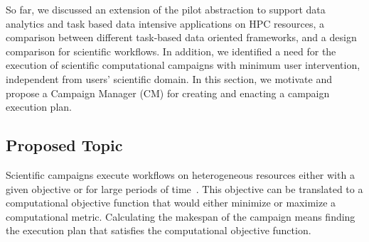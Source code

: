 \label{research}
So far, we discussed an extension of the pilot abstraction to support data analytics and task based data intensive applications on HPC resources, a comparison between different task-based data oriented frameworks, and a design comparison for scientific workflows.
In addition, we identified a need for the execution of scientific computational campaigns with minimum user intervention, independent from users' scientific domain.
In this section, we motivate and propose a Campaign Manager (CM) for creating and enacting a campaign execution plan. 


\subsection{Proposed Topic}

Scientific campaigns execute workflows on heterogeneous resources either with a given objective or for large periods of time~\cite{maeno2008panda}.
This objective can be translated to a computational objective function that would either minimize or maximize a computational metric.
Calculating the makespan of the campaign means finding the execution plan that satisfies the computational objective function.


